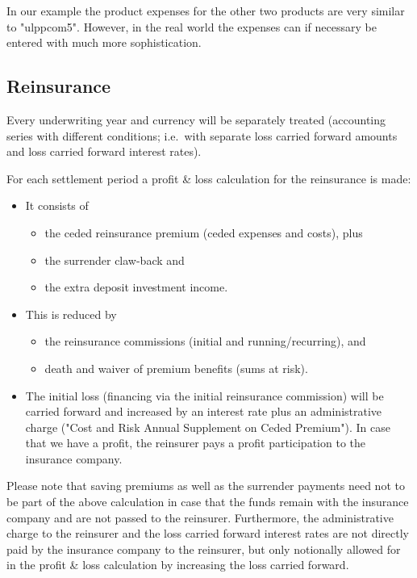 In our example the product expenses for the other two products are very similar to "ulppcom5". However, in the real world the expenses can if necessary be entered with much more sophistication.

\subsection{Reinsurance}

Every underwriting year and currency will be separately treated (accounting series with different conditions; i.e.~with separate loss carried forward amounts and loss carried forward interest rates).

For each settlement period a profit \& loss calculation for the reinsurance is made:
\begin{itemize}
	\item It consists of
		\begin{itemize}
			\item the ceded reinsurance premium (ceded expenses and costs), plus
				\item the surrender claw-back and
				\item the extra deposit investment income.
\end{itemize}
	\item This is reduced by
		\begin{itemize}
			\item the reinsurance commissions (initial and running/recurring), and
			\item death and waiver of premium benefits (sums at risk).
		\end{itemize}
	\item The initial loss (financing via the initial reinsurance commission) will be carried forward and increased by an interest rate plus an administrative charge ("Cost and Risk Annual Supplement on Ceded Premium"). In case that we have a profit, the reinsurer pays a profit participation to the insurance company.
\end{itemize}

Please note that saving premiums as well as the surrender payments need not to be part of the above calculation in case that the funds remain with the insurance company and are not passed to the reinsurer. Furthermore, the administrative charge to the reinsurer and the loss carried forward interest rates are not directly paid by the insurance company to the reinsurer, but only notionally allowed for in the profit \& loss calculation by increasing the loss carried forward.

